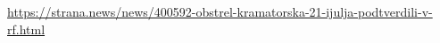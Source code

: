  
 
 
 
 

\url{https://strana.news/news/400592-obstrel-kramatorska-21-ijulja-podtverdili-v-rf.html}
